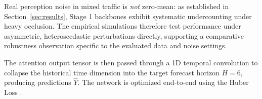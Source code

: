 \documentclass[a4paper,fleqn]{cas-sc}
\begin{document}
Real perception noise in mixed traffic is \emph{not} zero-mean: as established in Section~\ref{sec:results}, Stage 1 backbones exhibit systematic undercounting under heavy occlusion. The empirical simulations therefore test performance under asymmetric, heteroscedastic perturbations directly, supporting a comparative robustness observation specific to the evaluated data and noise settings.

The attention output tensor is then passed through a 1D temporal convolution to collapse the historical time dimension into the target forecast horizon $H=6$, producing predictions $\hat{Y}$. The network is optimized end-to-end using the Huber Loss \cite{huber}.



\end{document}
